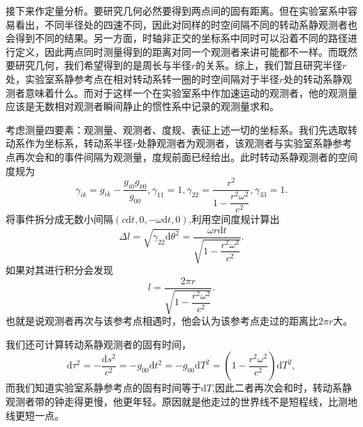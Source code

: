 \documentclass[11pt, a4paper, oneside, onecolumn]{ctexart}
\numberwithin{equation}{subsection}
\begin{document}
接下来作定量分析。要研究几何必然要得到两点间的固有距离。但在实验室系中容易看出，不同半径处的四速不同，因此对同样的时空间隔不同的转动系静观测者也会得到不同的结果。另一方面，时轴非正交的坐标系中同时可以沿着不同的路径进行定义，因此两点同时测量得到的距离对同一个观测者来讲可能都不一样。而既然要研究几何，我们希望得到的是周长与半径$r$的关系。综上，我们暂且研究半径$r$处，实验室系静参考点在相对转动系转一圈的时空间隔对于半径$r$处的转动系静观测者意味着什么。而对于这样一个在实验室系中作加速运动的观测者，他的观测量应该是无数相对观测者瞬间静止的惯性系中记录的观测量求和。

考虑测量四要素：观测量、观测者、度规、表征上述一切的坐标系。我们先选取转动系作为坐标系，转动系半径$r$处静观测者为观测者，该观测者与实验室系静参考点再次会和的事件间隔为观测量，度规前面已经给出。此时转动系静观测者的空间度规为
\begin{equation}
\gamma_{ik}=g_{ik}-\frac{g_{i0}g_{k0}}{g_{00}},\gamma_{11}=1,\gamma_{22}=\frac{r^{2}}{1-\dfrac{r^{2}\omega^{2}}{c^{2}}},\gamma_{33}=1.
\end{equation}
将事件拆分成无数小间隔$\left(c\mathrm{d}t,0,-\omega\mathrm{d}t,0\right)$,利用空间度规计算出
\begin{equation}
\Delta{}l=\sqrt{\gamma_{22}\mathrm{d}\theta^{2}}=\frac{\omega r\mathrm{d}t}{\sqrt{1-\dfrac{r^{2}\omega^{2}}{c^{2}}}}.
\end{equation}
如果对其进行积分会发现
\begin{equation}
l=\frac{2\pi r}{\sqrt{1-\dfrac{r^{2}\omega^{2}}{c^{2}}}}.
\end{equation}
也就是说观测者再次与该参考点相遇时，他会认为该参考点走过的距离比$2\pi r$大。

我们还可计算转动系静观测者的固有时间，
\begin{equation}
\mathrm{d}\tau^{2}=-\frac{\mathrm{d}s^{2}}{c^{2}}=-g_{00}\mathrm{d}t^{2}=-g_{00}\mathrm{d}T^{2}=\left(1-\frac{r^{2}\omega^{2}}{c^{2}}\right)\mathrm{d}T^{2},
\end{equation}
而我们知道实验室系静参考点的固有时间等于$\mathrm{d}T$,因此二者再次会和时，转动系静观测者带的钟走得更慢，他更年轻。原因就是他走过的世界线不是短程线，比测地线更短一点。
\end{document}
